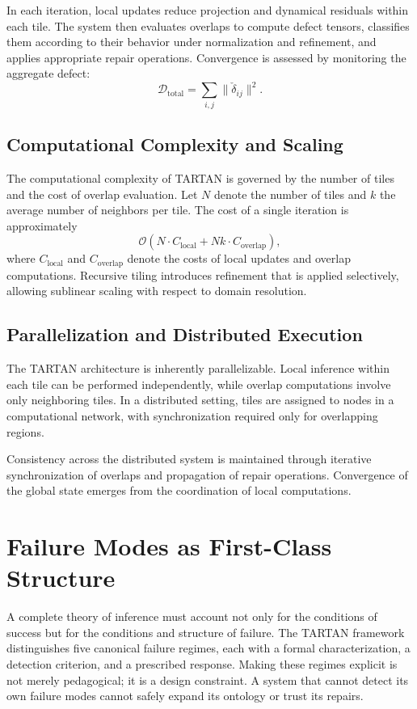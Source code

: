 \documentclass[12pt, oneside]{article}
\begin{document}
In each iteration, local updates reduce projection and dynamical residuals within each tile. The system then evaluates overlaps to compute defect tensors, classifies them according to their behavior under normalization and refinement, and applies appropriate repair operations. Convergence is assessed by monitoring the aggregate defect:
\[
\mathcal{D}_{\text{total}} = \sum_{i,j} \|\check{\delta}_{ij}\|^2.
\]

\subsection{Computational Complexity and Scaling}

The computational complexity of TARTAN is governed by the number of tiles and the cost of overlap evaluation. Let $N$ denote the number of tiles and $k$ the average number of neighbors per tile. The cost of a single iteration is approximately
\[
\mathcal{O}(N \cdot C_{\text{local}} + N k \cdot C_{\text{overlap}}),
\]
where $C_{\text{local}}$ and $C_{\text{overlap}}$ denote the costs of local updates and overlap computations. Recursive tiling introduces refinement that is applied selectively, allowing sublinear scaling with respect to domain resolution.

\subsection{Parallelization and Distributed Execution}

The TARTAN architecture is inherently parallelizable. Local inference within each tile can be performed independently, while overlap computations involve only neighboring tiles. In a distributed setting, tiles are assigned to nodes in a computational network, with synchronization required only for overlapping regions.

Consistency across the distributed system is maintained through iterative synchronization of overlaps and propagation of repair operations. Convergence of the global state emerges from the coordination of local computations.

\section{Failure Modes as First-Class Structure}
\label{sec:failure}

A complete theory of inference must account not only for the conditions of success but for the conditions and structure of failure. The TARTAN framework distinguishes five canonical failure regimes, each with a formal characterization, a detection criterion, and a prescribed response. Making these regimes explicit is not merely pedagogical; it is a design constraint. A system that cannot detect its own failure modes cannot safely expand its ontology or trust its repairs.
\end{document}
